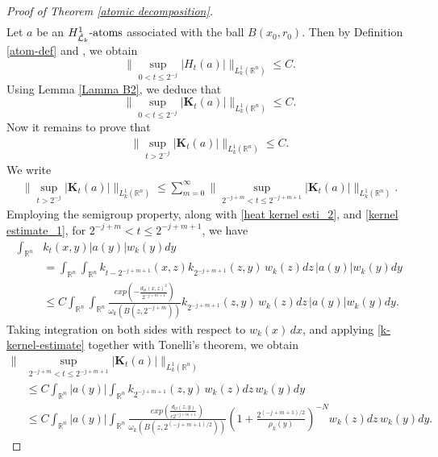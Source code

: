 \documentclass[11pt, reqno]{amsproc}
\theoremstyle{definition}
\theoremstyle{remark}
\numberwithin{equation}{section}
\begin{document}
\begin{proof}[Proof of Theorem \ref{atomic decomposition}]
\begin{align*}
    \end{align*} 
    Let $a$ be an 
    $H_{\Tilde{\mathcal{L}}_k}^{1} \text{-atoms}$ associated with the ball $B(x_0,r_0)$. Then by Definition \ref{atom-def} and \cite[Definition 5]{Hejna-2021}, we obtain 
    $$\Bigg\|  \sup\limits_{0<t \leq 2^{-j}}  \big| H_t\left( 
        a  \right)\big|  \Bigg\|_{L_k^1(\mathbb{R}^n)} \leq C.$$ 
    Using Lemma \ref{Lamma B2}, we deduce that 
    $$ \Bigg\|  \sup\limits_{0<t \leq 2^{-j}}  \big| \mathbf{K}_t\left( 
        a  \right)\big|  \Bigg\|_{L_k^1(\mathbb{R}^n)} \leq C.$$ 
    Now it remains to prove that 
     \begin{align*}
        \Bigg\|  \sup_{t> 2^{-j}}  \big| \mathbf{K}_t\left( 
        a  \right)\big|  \Bigg\|_{L_k^1(\mathbb{R}^n)} \leq C. 
     \end{align*} We write 
     \begin{align*}
         \Bigg\|  \sup_{t> 2^{-j}}  \big| \mathbf{K}_t\left( 
        a  \right)\big|  \Bigg\|_{L_k^1(\mathbb{R}^n)} \leq \sum_{m=0}^\infty \Bigg\|  \sup_{ 2^{-j+m} <t \leq 2^{-j+m+1}}  \big| \mathbf{K}_t\left( 
        a  \right)\big|  \Bigg\|_{L_k^1(\mathbb{R}^n)}.
     \end{align*} Employing the semigroup property, along with \eqref{heat kernel esti_2}, and \eqref{kernel estimate_1}, for $2^{-j+m}< t \leq 2^{-j+m+1}$, we have 
     \begin{align*}
         \int_{\mathbb{R}^n}& k_t(x,y)|a(y)|w_k(y)dy\\
         & =    \int_{\mathbb{R}^n} \int_{\mathbb{R}^n} k_{t-2^{-j+m+1}}(x,z)k_{2^{-j+m+1}}(z,y)\,w_k(z)dz\,|a(y)|w_k(y)dy\\
         & \leq C \int_{\mathbb{R}^n} \int_{\mathbb{R}^n}  \frac{exp\left( -\frac{d_\mathcal{O}(x,z)^2}{2^{-j+m+1}}\right)}{\omega_k(B(z,2^{-j+m}))} k_{2^{-j+m+1}}(z,y)\,w_k(z)dz\,|a(y)|w_k(y)dy.
     \end{align*}
     Taking integration on both sides with respect to $w_k(x)\,dx$, and applying \eqref{k-kernel-estimate} together with Tonelli's theorem, we obtain
\begin{align*}
         \Bigg\|  & \sup_{ 2^{-j+m} <t \leq 2^{-j+m+1}}  \big| \mathbf{K}_t\left( 
        a  \right)\big|  \Bigg\|_{L_k^1(\mathbb{R}^n)} \\
        & \leq C \int_{\mathbb{R}^n} |a(y)| \int_{\mathbb{R}^n}  k_{2^{-j+m+1}}(z,y)\,w_k(z)dz\,w_k(y)dy\\
        & \leq C \int_{\mathbb{R}^n} |a(y)| \int_{\mathbb{R}^n} \frac{exp\left( \frac{d_\mathcal{O}(z,y)} {c2^{-j+m+1}}\right)}{\omega_k\left(B(z,2^{(-j+m+1)/2})\right)} \left(1+ \frac{2^{(-j+m+1)/2}}{\rho_k(y)} \right)^{-N} w_k(z)dz\,w_k(y)dy.

\end{align*}
\end{proof}
\end{document}
